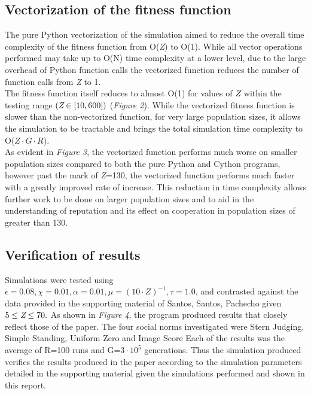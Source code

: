 \documentclass[10pt,a4paper]{article}
\begin{document}
\subsection{Vectorization of the fitness function}
The pure Python vectorization of the simulation aimed to reduce the overall time complexity of the fitness function from O(\emph{Z}) to O(1).
While all vector operations performed may take up to O(N) time complexity at a lower level, due to the large overhead of Python function calls the vectorized function reduces the number of function calls from \emph{Z} to 1.
\\
The fitness function itself reduces to almost O(1) for values of $\emph{Z}$ within the testing range $(\emph{Z} \in [10, 600])$ (\textit{Figure 2}).
While the vectorized fitness function is slower than the non-vectorized function, for very large population sizes, it allows the simulation to be tractable and brings the total simulation time complexity to O(\emph{$Z \cdot G\cdot R$}).
\\
As evident in \textit{Figure 3}, the vectorized function performs much worse on smaller population sizes compared to both the pure Python and Cython programs, however past the mark of \emph{Z}=130, the vectorized function performs much faster with a greatly improved rate of increase.
This reduction in time complexity allows further work to be done on larger population sizes and to aid in the understanding of reputation and its effect on cooperation in population sizes of greater than 130.

\subsection{Verification of results}
Simulations were tested using $\epsilon = 0.08, \chi = 0.01, \alpha = 0.01, \mu = (10 \cdot Z)^{-1}, \tau = 1.0$, and contrasted against the data provided in the supporting material of Santos, Santos, Pachecho given $ 5 \leq \emph{Z} \leq 70.$
As shown in \textit{Figure 4}, the program produced results that closely reflect those of the paper. 
The four social norms investigated were Stern Judging, Simple Standing, Uniform Zero and Image Score
Each of the results was the average of R=100 runs and G=$3 \cdot 10^{5}$ generations. 
Thus the simulation produced verifies the results produced in the paper according to the simulation parameters detailed in the supporting material given the simulations performed and shown in this report.
\end{document}
